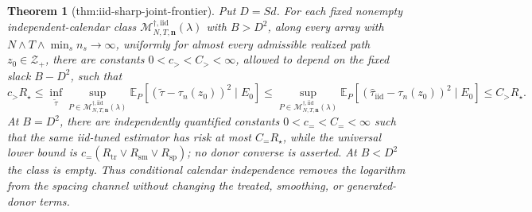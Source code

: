 \documentclass{article}
\newtheorem{theorem}{Theorem}
\begin{document}
\begin{theorem}[thm:iid-sharp-joint-frontier]\label{thm:iid-sharp-joint-frontier}
Put \(D=Sd\).  For each fixed nonempty independent-calendar class \(\mathcal M_{N,T,\mathbf n}^{\dagger,\mathrm{iid}}(\lambda)\) with \(B>D^2\), along every array with \(N\wedge T\wedge\min_s n_s\to\infty\), uniformly for almost every admissible realized path \(z_0\in\mathcal Z_+\), there are constants \(0<c_{>}<C_{>}<\infty\), allowed to depend on the fixed slack \(B-D^2\), such that
\[
c_{>}R_\star\le
\inf_{\widetilde\tau}\sup_{P\in\mathcal M_{N,T,\mathbf n}^{\dagger,\mathrm{iid}}(\lambda)}
\mathbb E_P[(\widetilde\tau-\tau_n(z_0))^2\mid E_0]
\le
\sup_{P\in\mathcal M_{N,T,\mathbf n}^{\dagger,\mathrm{iid}}(\lambda)}
\mathbb E_P[(\widehat\tau_{\mathrm{iid}}-\tau_n(z_0))^2\mid E_0]
\le C_{>}R_\star.
\]
At \(B=D^2\), there are independently quantified constants \(0<c_{=}<C_{=}<\infty\) such that the same iid-tuned estimator has risk at most \(C_{=}R_\star\), while the universal lower bound is \(c_{=}(R_{\mathrm{tr}}\vee R_{\mathrm{sm}}\vee R_{\mathrm{sp}})\); no donor converse is asserted.  At \(B<D^2\) the class is empty.  Thus conditional calendar independence removes the logarithm from the spacing channel without changing the treated, smoothing, or generated-donor terms.
\end{theorem}
\end{document}
